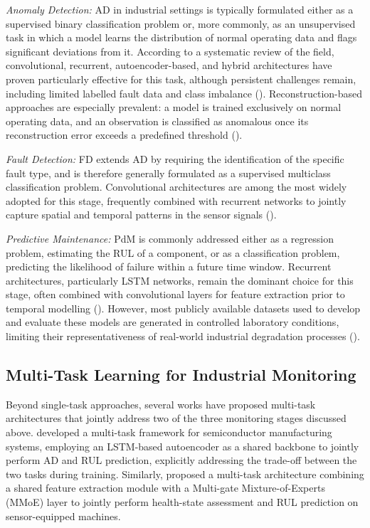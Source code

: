 \textit{Anomaly Detection:} AD in industrial settings is typically formulated either as a supervised binary 
classification problem or, more commonly, as an unsupervised task in which a model learns the distribution 
of normal operating data and flags significant deviations from it. According to a systematic review of the 
field, convolutional, recurrent, autoencoder-based, and hybrid architectures have proven particularly 
effective for this task, although persistent challenges remain, including limited labelled fault data and 
class imbalance (\cite{Zaidi2026}). Reconstruction-based approaches are especially prevalent: a model is 
trained exclusively on normal operating data, and an observation is classified as anomalous once its 
reconstruction error exceeds a predefined threshold (\cite{Khan2026}).

\textit{Fault Detection:} FD extends AD by requiring the identification of the specific fault type, and is 
therefore generally formulated as a supervised multiclass classification problem. Convolutional architectures 
are among the most widely adopted for this stage, frequently combined with recurrent networks to jointly 
capture spatial and temporal patterns in the sensor signals (\cite{Khan2026,Zaidi2026}).

\textit{Predictive Maintenance:} PdM is commonly addressed either as a regression problem, estimating the 
RUL of a component, or as a classification problem, predicting the likelihood of 
failure within a future time window. Recurrent architectures, particularly LSTM networks, remain the 
dominant choice for this stage, often combined with convolutional layers for feature extraction prior to 
temporal modelling (\cite{Khan2026}). However, most publicly available datasets used to develop and evaluate 
these models are generated in controlled laboratory conditions, limiting their representativeness of 
real-world industrial degradation processes (\cite{Khan2026}).

\subsection{Multi-Task Learning for Industrial Monitoring}

Beyond single-task approaches, several works have proposed multi-task architectures that jointly address 
two of the three monitoring stages discussed above. \cite{Yin2026} developed a multi-task framework for 
semiconductor manufacturing systems, employing an LSTM-based autoencoder as a shared backbone to jointly 
perform AD and RUL prediction, explicitly addressing the trade-off between the two tasks during training. 
Similarly, \cite{Yan2023} proposed a multi-task architecture combining a shared feature extraction module 
with a Multi-gate Mixture-of-Experts (MMoE) layer to jointly perform health-state assessment and RUL 
prediction on sensor-equipped machines.


